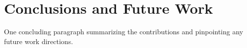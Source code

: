 \section{Conclusions and Future Work}
\label{sec:conclusions}

One concluding paragraph summarizing the contributions and pinpointing any future work directions.